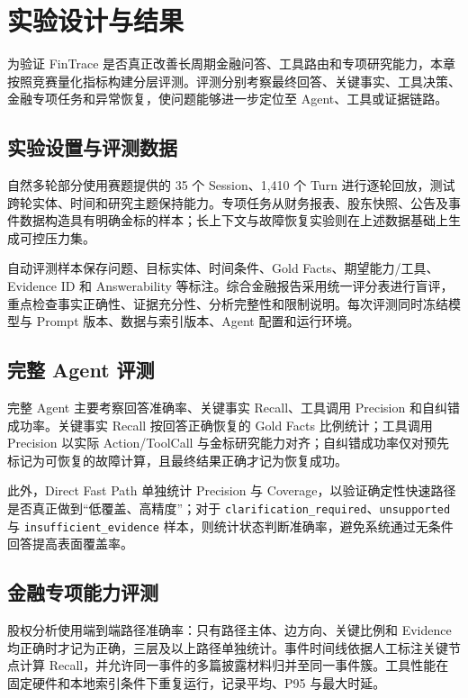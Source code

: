 \section{实验设计与结果}
\label{sec:evaluation}

为验证 FinTrace 是否真正改善长周期金融问答、工具路由和专项研究能力，本章按照竞赛量化指标构建分层评测。评测分别考察最终回答、关键事实、工具决策、金融专项任务和异常恢复，使问题能够进一步定位至 Agent、工具或证据链路。

\subsection{实验设置与评测数据}

自然多轮部分使用赛题提供的 35 个 Session、1,410 个 Turn 进行逐轮回放，测试跨轮实体、时间和研究主题保持能力。专项任务从财务报表、股东快照、公告及事件数据构造具有明确金标的样本；长上下文与故障恢复实验则在上述数据基础上生成可控压力集。

自动评测样本保存问题、目标实体、时间条件、Gold Facts、期望能力/工具、Evidence ID 和 Answerability 等标注。综合金融报告采用统一评分表进行盲评，重点检查事实正确性、证据充分性、分析完整性和限制说明。每次评测同时冻结模型与 Prompt 版本、数据与索引版本、Agent 配置和运行环境。

\subsection{完整 Agent 评测}

完整 Agent 主要考察回答准确率、关键事实 Recall、工具调用 Precision 和自纠错成功率。关键事实 Recall 按回答正确恢复的 Gold Facts 比例统计；工具调用 Precision 以实际 Action/ToolCall 与金标研究能力对齐；自纠错成功率仅对预先标记为可恢复的故障计算，且最终结果正确才记为恢复成功。

此外，Direct Fast Path 单独统计 Precision 与 Coverage，以验证确定性快速路径是否真正做到“低覆盖、高精度”；对于 \texttt{clarification\_required}、\texttt{unsupported} 与 \texttt{insufficient\_evidence} 样本，则统计状态判断准确率，避免系统通过无条件回答提高表面覆盖率。

\subsection{金融专项能力评测}

股权分析使用端到端路径准确率：只有路径主体、边方向、关键比例和 Evidence 均正确时才记为正确，三层及以上路径单独统计。事件时间线依据人工标注关键节点计算 Recall，并允许同一事件的多篇披露材料归并至同一事件簇。工具性能在固定硬件和本地索引条件下重复运行，记录平均、P95 与最大时延。

